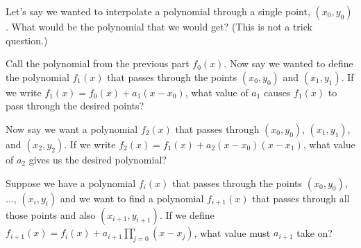 \documentclass[11pt]{article}
\begin{document}
\begin{Parts}

	\Part Let's say we wanted to interpolate a polynomial through a single point, $(x_0, y_0)$.  What would be the polynomial that we would get?  (This is not a trick question.)
	
	\Part Call the polynomial from the previous part $f_0(x)$.  Now say we wanted to define the polynomial $f_1(x)$ that passes through the points $(x_0, y_0)$ and $(x_1, y_1)$.  If we write $f_1(x) = f_0(x) + a_1(x - x_0)$, what value of $a_1$ causes $f_1(x)$ to pass through the desired points?
	
	\Part Now say we want a polynomial $f_2(x)$ that passes through $(x_0, y_0)$, $(x_1, y_1)$, and $(x_2, y_2)$.  If we write $f_2(x) = f_1(x) + a_2(x - x_0)(x - x_1)$, what value of $a_2$ gives us the desired polynomial?
	
	\Part Suppose we have a polynomial $f_i(x)$ that passes through the points $(x_0, y_0)$, ..., $(x_i, y_i)$ and we want to find a polynomial $f_{i + 1}(x)$ that passes through all those points and also $(x_{i + 1}, y_{i + 1})$.  If we define $f_{i + 1}(x) = f_i(x) + a_{i + 1}\prod_{j = 0}^i (x - x_j)$, what value must $a_{i + 1}$ take on?
	
	
\end{Parts}
\end{document}
